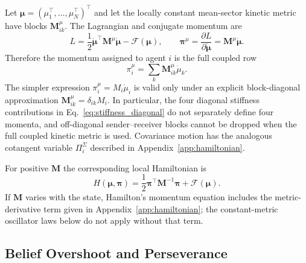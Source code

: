 \documentclass[12pt]{article}
\begin{document}
Let $\boldsymbol\mu=(\mu_1^\top,\ldots,\mu_N^\top)^\top$ and let the locally constant mean-sector kinetic metric have blocks $\mathbf M_{ik}^\mu$.  The Lagrangian and conjugate momentum are
\begin{equation}
L=\frac12\dot{\boldsymbol\mu}^{\top}\mathbf M^\mu
\dot{\boldsymbol\mu}-\mathcal F(\boldsymbol\mu),
\qquad
\boldsymbol\pi^\mu
=\frac{\partial L}{\partial\dot{\boldsymbol\mu}}
=\mathbf M^\mu\dot{\boldsymbol\mu}.
\label{eq:conditional_mean_lagrangian}
\end{equation}
Therefore the momentum assigned to agent $i$ is the full coupled row
\begin{equation}
\boxed{
\pi_i^\mu=\sum_k\mathbf M_{ik}^\mu\dot\mu_k.}
\label{eq:full_coupled_momentum}
\end{equation}
The simpler expression $\pi_i^\mu=M_i\dot\mu_i$ is valid only under an explicit block-diagonal approximation $\mathbf M_{ik}^\mu=\delta_{ik}M_i$.  In particular, the four diagonal stiffness contributions in Eq.~\eqref{eq:stiffness_diagonal} do not separately define four momenta, and off-diagonal sender--receiver blocks cannot be dropped when the full coupled kinetic metric is used.  Covariance motion has the analogous cotangent variable $\Pi_i^\Sigma$ described in Appendix~\ref{app:hamiltonian}.

For positive $\mathbf M$ the corresponding local Hamiltonian is
\begin{equation}
\boxed{
H(\boldsymbol\mu,\boldsymbol\pi)
=\frac12\boldsymbol\pi^{\top}\mathbf M^{-1}\boldsymbol\pi
+\mathcal F(\boldsymbol\mu).}
\label{eq:conditional_local_hamiltonian}
\end{equation}
If $\mathbf M$ varies with the state, Hamilton's momentum equation includes the metric-derivative term given in Appendix~\ref{app:hamiltonian}; the constant-metric oscillator laws below do not apply without that term.

\subsection{Belief Overshoot and Perseverance}\label{sec:overshoot}
\end{document}
